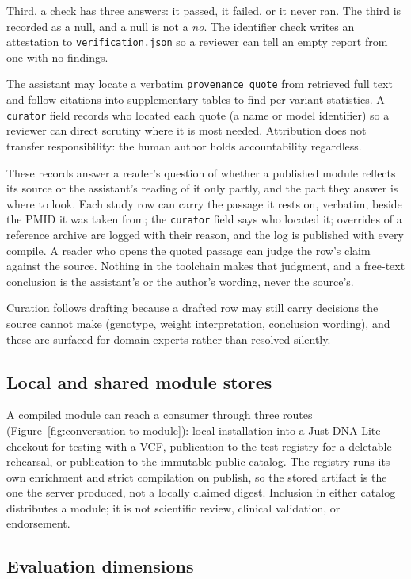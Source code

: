 \documentclass[11pt,a4paper]{article}
\begin{document}
Third, a check has three answers: it passed, it failed, or it never
ran. The third is recorded as a null, and a null is not a \emph{no}. The
identifier check writes an attestation to \texttt{verification.json} so a
reviewer can tell an empty report from one with no findings.

The assistant may locate a verbatim \texttt{provenance\_quote} from retrieved
full text and follow citations into supplementary tables to find per-variant
statistics. A \texttt{curator} field records who located each quote (a name
or model identifier) so a reviewer can direct scrutiny where it is most
needed. Attribution does not transfer responsibility: the human author holds
accountability regardless.

These records answer a reader's question of whether a published module
reflects its source or the assistant's reading of it only partly, and the
part they answer is where to look. Each study row can carry the passage it
rests on, verbatim, beside the PMID it was taken from; the \texttt{curator}
field says who located it; overrides of a reference archive are logged with
their reason, and the log is published with every compile. A reader who opens
the quoted passage can judge the row's claim against the source. Nothing in
the toolchain makes that judgment, and a free-text conclusion is the
assistant's or the author's wording, never the source's.

Curation follows drafting because a drafted row may still carry decisions the
source cannot make (genotype, weight interpretation, conclusion wording), and
these are surfaced for domain experts rather than resolved silently.

\subsection{Local and shared module stores}

A compiled module can reach a consumer through three routes
(Figure~\ref{fig:conversation-to-module}): local installation into a Just-DNA-Lite
checkout for testing with a VCF, publication to the test registry for a
deletable rehearsal, or publication to the immutable public catalog. The registry runs its own enrichment and
strict compilation on publish, so the stored artifact is the one the server
produced, not a locally claimed digest. Inclusion in either catalog
distributes a module; it is not scientific review, clinical validation, or
endorsement.

\subsection{Evaluation dimensions}
\end{document}
